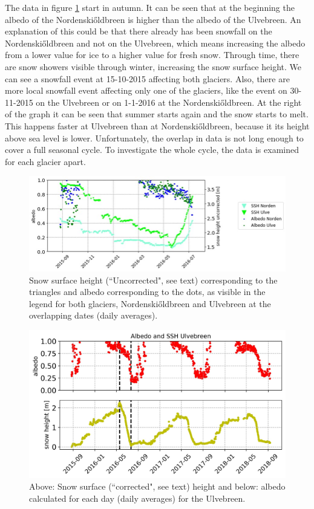 \documentclass[11pt]{report}
\begin{document}
The data in figure \ref{fig:S1} start in autumn. It can be seen that at the beginning the albedo of the Nordenski\H{o}ldbreen is higher than the albedo of the Ulvebreen. An explanation of this could be that there already has been snowfall on the Nordenski\H{o}ldbreen and not on the Ulvebreen, which means increasing the albedo from a lower value for ice to a higher value for fresh snow. Through time, there are snow showers visible through winter, increasing the snow surface height. We can see a snowfall event at 15-10-2015 affecting both glaciers. Also, there are more local snowfall event affecting only one of the glaciers, like the event on 30-11-2015 on the Ulvebreen or on 1-1-2016 at the Nordenski\H{o}ldbreen. At the right of the graph it can be seen that summer starts again and the snow starts to melt. This happens faster at Ulvebreen than at Nordenski\H{o}ldbreen, because it its height above sea level is lower. 
Unfortunately, the overlap in data is not long enough to cover a full seasonal cycle. To investigate the whole cycle, the data is examined for each glacier apart. 

\begin{figure}[h]
\includegraphics[scale=1, width=1\textwidth]{Picture1.jpg}
\caption{Snow surface height (``Uncorrected", see text) corresponding to the triangles and albedo corresponding to the dots, as visible in the legend for both glaciers, Nordenski\H{o}ldbreen and Ulvebreen at the overlapping dates (daily averages).}
\label{fig:S1}
\end{figure}

\begin{figure}[h]
\includegraphics[scale=1, width=1\textwidth]{Picture2.jpg}
\caption{Above: Snow surface (``corrected", see text) height and below: albedo calculated for each day (daily averages) for the Ulvebreen.}
\label{fig:S2}
\end{figure}
\end{document}
